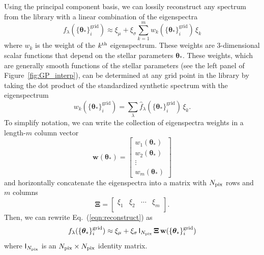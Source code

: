 \documentclass[iop,floatfix,numberedappendix,twocolappendix]{emulateapj}
\newcommand{\vt}{ {\bm \theta}}
\begin{document}
Using the principal component basis, we can lossily reconstruct any spectrum from the library with 
a linear combination of the eigenspectra
\begin{equation}
  f_\lambda(\{\vt_\ast \}^\textrm{grid}_i) \approx \xi_\mu + \xi_\sigma \sum_{k=1}^m w_k(\{\vt_\ast \}^\textrm{grid}_i) \, \xi_k
  \label{eqn:reconstruct}
\end{equation}
where $w_k$ is the weight of the $k^{\rm th}$ eigenspectrum.  These weights are 3-dimensional 
scalar functions that depend on the stellar parameters $\vt_\ast$.  These weights, which are 
generally smooth functions of the stellar parameters (see the left panel of 
Figure~\ref{fig:GP_interp}), can be determined at any grid point in the library by taking the dot 
product of the standardized synthetic spectrum with the eigenspectrum  
\begin{equation}
  w_k(\{\vt_\ast \}^\textrm{grid}_i) = \sum_\lambda \hat{f}_\lambda(\{\vt_\ast \}^\textrm{grid}_i) \, \xi_k.
\end{equation}
To simplify notation, we can write the collection of eigenspectra weights in a length-$m$ column 
vector
\begin{equation}
  \mathbf{w}(\vt_\ast) = 
  \begin{bmatrix}
    w_1(\vt_\ast )\\
    w_2(\vt_\ast )\\
    \vdots\\
    w_m(\vt_\ast )
  \end{bmatrix}
\end{equation}
and horizontally concatenate the eigenspectra into a matrix with $N_{\rm pix}$ rows and $m$ columns
\begin{equation}
  \mathbf{\Xi} = 
  \begin{bmatrix}
    \xi_1 & \xi_2 & \cdots & \xi_m \\
  \end{bmatrix} .
\end{equation}
Then, we can rewrite Eq.~(\ref{eqn:reconstruct}) as
\begin{equation}
  f_\lambda(\{\vt_\ast \}^\textrm{grid}_i) \approx \xi_\mu + \xi_\sigma \, \mathsf{I}_{N_{\rm pix}} \, \mathbf{\Xi} \, \mathbf{w}(\{\vt_\ast \}^\textrm{grid}_i)
  \label{eqn:reconstruct2}
\end{equation}
where $\mathsf{I}_{N_{\rm pix}}$ is an $N_{\rm pix} \times N_{\rm pix}$ identity matrix. 
\end{document}
